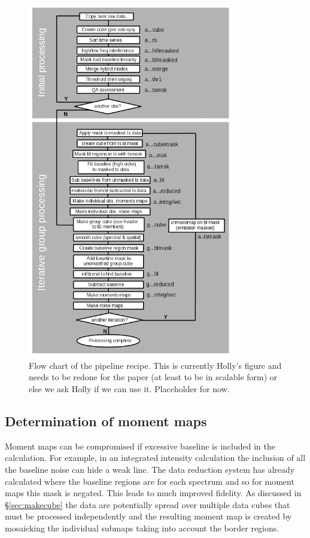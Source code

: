 \documentclass[final,authoryear,5p,times,twocolumn]{elsarticle}
\begin{document}
\begin{figure}
\includegraphics[width=90mm]{flowchart.png}
\caption{Flow chart of the pipeline recipe. This is currently Holly's
  figure and needs to be redone for the paper (at least to be in
  scalable form) or else we ask Holly if we can use it. Placeholder
  for now.}
\label{fig:flowchart}
\end{figure}

\subsection{Determination of moment maps}

Moment maps can be compromised if excessive baseline is included in
the calculation. For example, in an integrated intensity calculation
the inclusion of all the baseline noise can hide a weak line. The data
reduction system has already calculated where the baseline regions are
for each spectrum and so for moment maps this mask is negated. This
leads to much improved fidelity. As discussed in \S \ref{sec:makecube}
the data are potentially spread over multiple data cubes that must be
processed independently and the resulting moment map is created by
mosaicking the individual submaps taking into account the border
regions.
\end{document}
